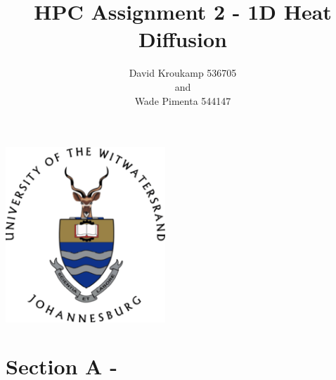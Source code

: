 \documentclass[11pt,a4paper]{article}
\author{David Kroukamp 536705\\and\\Wade Pimenta 544147}
\title{HPC Assignment 2 - 1D Heat Diffusion}
\begin{document}
\null  %
\nointerlineskip  %
\vfill
\let\snewpage \newpage
\let\newpage \relax
\begin{center}
	\includegraphics[width=6cm]{logo.png}
\end{center}

\maketitle
\let \newpage \snewpage
\vfill 
\break %

\newpage
\tableofcontents
\newpage
\section{Section A - }


\newpage
{}
\end{document}
